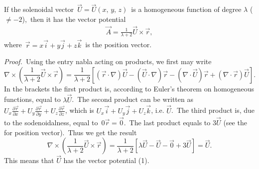 \documentclass[12pt]{article}
\theoremstyle{definition}
\begin{document}
If the solenoidal vector \,$\vec{U} = \vec{U}(x,\,y,\,z)$\, is a homogeneous function of degree $\lambda$ ($\neq -2$),\, then it has the vector potential
\begin{align}
\vec{A} = \frac{1}{\lambda\!+\!2}\vec{U}\!\times\!\vec{r},
\end{align}
where\, $\vec{r} = x\vec{i}\!+\!y\vec{j}\!+\!z\vec{k}$\, is the position vector.

{\em Proof.}\, Using the entry nabla acting on products, we first may write
$$\nabla\times(\frac{1}{\lambda\!+\!2}\vec{U}\!\times\!\vec{r}) =
\frac{1}{\lambda\!+\!2}[(\vec{r}\cdot\nabla)\vec{U}
-(\vec{U}\cdot\nabla)\vec{r}-(\nabla\cdot\vec{U})\vec{r}
+(\nabla\cdot\vec{r})\vec{U}].$$
In the brackets the first product is, according to Euler's theorem on homogeneous functions, equal to $\lambda\vec{U}$.\, The second product can be written as\, $U_x\frac{\partial\vec{r}}{\partial x}+
U_y\frac{\partial\vec{r}}{\partial y}+U_z\frac{\partial\vec{r}}{\partial z}$, which is $U_x\vec{i}+U_y\vec{j}+U_z\vec{k}$, i.e. $\vec{U}$.\, The third product is, due to the sodenoidalness, equal to\, $0\vec{r} = \vec{0}$.\, The last product equals to $3\vec{U}$ (see the  for position vector).\, Thus we get the result
$$\nabla\times(\frac{1}{\lambda\!+\!2}\vec{U}\!\times\!\vec{r}) =
\frac{1}{\lambda\!+\!2}[\lambda\vec{U}-\vec{U}-\vec{0}+3\vec{U}] = \vec{U}.$$
This means that $\vec{U}$ has the vector potential (1).
\end{document}
